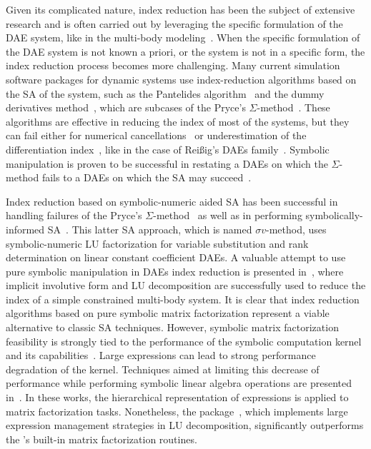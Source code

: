 Given its complicated nature, index reduction has been the subject of extensive research and is often carried out by leveraging the specific formulation of the \ac{DAE} system, like in the multi-body modeling~\cite{zhou2005implicit, zhou2007symbolic, zhou2007symbolicseq, bayo1988modified, wehage1982generalized}. When the specific formulation of the \ac{DAE} system is not known a priori, or the system is not in a specific form, the index reduction process becomes more challenging. Many current simulation software packages for dynamic systems use index-reduction algorithms based on the \ac{SA} of the system, such as the Pantelides algorithm~\cite{pantelides1988consistent} and the dummy derivatives method~\cite{mattsson1993index}, which are subcases of the Pryce's $\Sigma$-method~\cite{pryce1998solving, pryce2001simple, nedialkov2007solvingI, nedialkov2007solvingII, nedialkov2008solvingIII, nedialkov2015algorithm, tan2016symbolic, mckenzie2017structural}. These algorithms are effective in reducing the index of most of the systems, but they can fail either for numerical cancellations~\cite{iwata2019index} or underestimation of the differentiation index~\cite{pantelides1988consistent, unger1995structural}, like in the case of Rei{\ss}ig's \acp{DAE} family~\cite{reissig2000differential}. Symbolic manipulation is proven to be successful in restating a \acp{DAE} on which the $\Sigma$-method fails to a \acp{DAE} on which the \ac{SA} may succeed~\cite{tan2016symbolic}.

Index reduction based on symbolic-numeric aided \ac{SA} has been successful in handling failures of the Pryce's $\Sigma$-method~\cite{tan2016symbolic} as well as in performing symbolically-informed \ac{SA}~\cite{chowdhry2004symbolic}. This latter \ac{SA} approach, which is named $\sigma v$-method, uses symbolic-numeric \ac{LU} factorization for variable substitution and rank determination on linear constant coefficient \acp{DAE}. A valuable attempt to use pure symbolic manipulation in \acp{DAE} index reduction is presented in~\cite{zhou2005implicit, zhou2007symbolic, zhou2007symbolicseq}, where implicit involutive form and \ac{LU} decomposition are successfully used to reduce the index of a simple constrained multi-body system. It is clear that index reduction algorithms based on pure symbolic matrix factorization represent a viable alternative to classic \ac{SA} techniques. However, symbolic matrix factorization feasibility is strongly tied to the performance of the symbolic computation kernel and its capabilities~\cite{zhou2008fraction}. Large expressions can lead to strong performance degradation of the kernel. Techniques aimed at limiting this decrease of performance while performing symbolic linear algebra operations are presented in~\cite{zhou2006hierarchical, zhou2007symbolic, zhou2007symbolicseq}. In these works, the hierarchical representation of expressions is applied to matrix factorization tasks. Nonetheless, the \LULEM{} package~\cite{carette2006linear}, which implements large expression management strategies in \ac{LU} decomposition, significantly outperforms the \Maple{}'s built-in matrix factorization routines.

